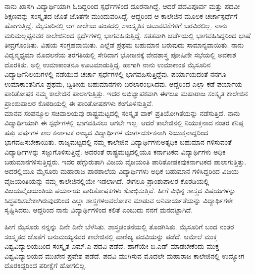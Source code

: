 {ನಾನು ಖಾಸಗಿ ವಿದ್ಯಾರ್ಥಿಯಾಗಿ ಓದಿದ್ದರಿಂದ ಸ್ಪರ್ಧೆಗಳಿಂದ ದೂರನಾಗಿದ್ದೆ.  ಆದರೆ ಪದವಿಪೂರ್ವ ಮತ್ತು ಪದವೀ ಶಿಕ್ಷಣವನ್ನು ಸಂಸ್ಕೃತದ ಜೊತೆ ಜೊತೆಗೇ ಮುಂದುವರಿಸಿದ್ದೆ.  ಆದ್ದರಿಂದ  ಆ ಕಾಲೇಜಿನ ಮೂಲಕ ಚರ್ಚಾಸ್ಪರ್ಧೆಗೆ ಹೋಗುತ್ತಿದ್ದೆ.  ಮೈಸೂರಿನಲ್ಲಿ ಆಗ ಕಾಲೇಜು ಹಂತದಲ್ಲಿ ಸಾಂಸ್ಕೃತಿಕ ಚಟುವಟಿಕೆಗಳಿಗೆ ಬರವಿರಲಿಲ್ಲ.  ನಾನು ಮರಿಮಲ್ಲಪ್ಪನವರ ಕಾಲೇಜಿನಿಂದ ಸ್ಪರ್ಧೆಗಳಲ್ಲಿ ಭಾಗವಹಿಸುತ್ತಿದ್ದೆ.  ಸತತವಾಗಿ ಚರ್ಚೆಯಲ್ಲಿ ಭಾಗವಹಿಸಿದ್ದರಿಂದ ಭಾಷೆ ತೀವ್ರಗೊಂಡಿತು.  ವಿಷಯ ಸಂಗ್ರಹವಾಯಿತು.  ಎಲ್ಲೆಡೆ ಪ್ರಥಮ ಬಹುಮಾನ ಬರುವುದು ಸಾಮಾನ್ಯವಾಯಿತು.  ನಾನು ವಿದ್ವನ್ಮಧ್ಯಮಾ ಮೊದಲನೆಯ ತರಗತಿಯಲ್ಲಿ ಸೇರಿದಾಗ ಭೋಜನಕ್ಕೆ ವೇದಶಾಸ್ತ್ರ ಪೋಷಿಣೀ ಸಭೆಯಲ್ಲಿ ಅವಕಾಶ ದೊರಕಿತು.  ಅಲ್ಲಿ ಉಮಾಕಾಂತನೂ ಊಟಮಾಡುತ್ತಿದ್ದ.  ಹಾಗಾಗಿ ನಾನು ಉಮಾಕಾಂತ ಮೈಸೂರಿನ ವಿದ್ಯಾರ್ಥಿನಿಲಯಗಳಲ್ಲಿ ನಡೆಯುವ ಚರ್ಚಾ \hbox{ಸ್ಪರ್ಧೆಗಳಲ್ಲಿ} ಭಾಗವಹಿಸುತ್ತಿದ್ದೆವು.  ಪರ್ಯಾಯದಂತೆ ನನಗೂ ಉಮಾಕಾಂತನಿಗೂ ಪ್ರಥಮ, ದ್ವಿತೀಯ ಬಹುಮಾನಗಳು ಬರಲಾರಂಭಿಸಿದವು.  ಆದ್ದರಿಂದ ಎಲ್ಲಾ ಕಡೆ ಪರ್ಯಾಯ ಪಾರಿ\-ತೋಷಕ ನಮ್ಮ ಕಾಲೇಜಿನ ಪಾಲಾಗುತ್ತಿತ್ತು. ಇದರ ಅಭಿಜ್ಞಾಪಕವಾಗಿ ಈಗಲೂ \hbox{ಮಹಾರಾಜ} ಸಂಸ್ಕೃತ ಕಾಲೇಜಿನ ಪ್ರಾಂಶುಪಾಲರ ಕೊಠಡಿಯಲ್ಲಿ ಈ ಪಾರಿತೋಷಕಗಳು ಕಂಗೊಳಿಸುತ್ತಿವೆ.  
~\\[0.3cm]
ಮಾನವ ಸಂಪನ್ಮೂಲ ಸಚಿವಾಲಯವು ರಾಷ್ಟ್ರಮಟ್ಟದಲ್ಲಿ ಸಂಸ್ಕೃತ ವಾಕ್ ಪ್ರತಿ\-ಯೋಗಿತೆಯನ್ನು ನಡೆಸುತ್ತಿದೆ.  ನಾನು ವಿದ್ಯಾರ್ಥಿಯಾಗಿ ಈ ಸ್ಪರ್ಧೆಗಳಲ್ಲಿ ಭಾಗ\-ವಹಿಸಲು ಆಗಲೇ ಇಲ್ಲ.  ಆದರೆ ಕಾಲೇಜಿನಲ್ಲಿ ನಿಯುಕ್ತನಾದ ನಂತರ ಕನಿಷ್ಠ ಹತ್ತು ವರ್ಷಗಳ ಕಾಲ ಕರ್ನಾಟಕ ರಾಜ್ಯದ ವಿದ್ಯಾರ್ಥಿಗಳ ಮಾರ್ಗದರ್ಶಕನಾಗಿ ನಿಯುಕ್ತನಾದ್ದರಿಂದ ಭಾಗವ\-ಹಿಸಬೇಕಾಯಿತು.  ರಾಜ್ಯಮಟ್ಟದಲ್ಲಿ ನಮ್ಮ ಕಾಲೇಜಿನ ವಿದ್ಯಾರ್ಥಿಗಳು\break ಅತ್ಯಧಿಕ ಬಹುಮಾನ ಗಳಿಸುವಂತೆ ವಿದ್ಯಾರ್ಥಿಗಳನ್ನು ಸಜ್ಜುಗೊಳಿಸುತ್ತಿದ್ದೆ.  ಅದರಂತೆ ರಾಷ್ಟ್ರಮಟ್ಟದಲ್ಲಿಯೂ ಕರ್ನಾಟಕದ ವಿದ್ಯಾರ್ಥಿಗಳು ಅಧಿಕ ಬಹುಮಾನ\break ಗಳಿಸುತ್ತಿದ್ದರು.  ಇದರ ಹೆಗ್ಗುರುತಾಗಿ ವಿಜಯ ವೈಜಯಂತಿ ಪಾರಿತೋಷಕವು\break ಕರ್ನಾಟಕದ ಪಾಲಾಗುತ್ತಿತ್ತು.  ಅದರಲ್ಲಿಯೂ ಮೈಸೂರು ಮಹಾರಾಜ ಪಾಠಶಾಲೆಯ ವಿದ್ಯಾರ್ಥಿ\-ಗಳು ಅಧಿಕ ಬಹುಮಾನ ಗಳಿಸಿದ್ದರಿಂದ ವಿಜಯ \hbox{ವೈಜಯಂತಿಯನ್ನು} ನಮ್ಮ ಕಾಲೇಜಿನಲ್ಲಿಯೇ ಇಡಲಾಗಿದೆ.  ಈಗಲೂ ಪ್ರಾಂಶುಪಾಲರ ಕೊಠಡಿಯಲ್ಲಿ ವಿಜಯ\hbox{ವೈಜಯಂತಿಯ} ಪರ್ಯಾಯ ಪಾರಿತೋಷಕಗಳು ಶೋಭಿಸುತ್ತಿವೆ.  ಹೀಗೆ ವಿಭಿನ್ನ ಶಾಸ್ತ್ರದ ವಿಷಯಗಳನ್ನು ಸಿದ್ಧಪಡಿಸಬೇಕಾಗಿರುವುದರಿಂದ ಎಲ್ಲಾ ಶಾಸ್ತ್ರಗಳ\break ಅವಲೋಕನ ಮಾಡುವ ಅನಿವಾರ್ಯತೆಯನ್ನು ವಿದ್ಯಾರ್ಥಿಗಳೇ ಸೃಷ್ಟಿಸಿದರು.   ಆದ್ದರಿಂದ ನಾನು ವಿದ್ಯಾರ್ಥಿಗಳಿಂದ ಕಲಿತೆ ಎಂಬುದು ನನಗೆ ಮನದಟ್ಟಾಗಿದೆ.  

ಹೀಗೆ ಮೈಸೂರು ನನ್ನನ್ನು ದಿನೇ ದಿನೇ ಬೆಳೆಸಿತು.  ಶಾಸ್ತ್ರಚಿಂತನೆಯಲ್ಲಿ ತೊಡಗಿಸಿತು.  ಮೈಸೂರಿಗೆ ಬಂದ ನಂತರ ಸಂಸ್ಕೃತದ ಜೊತೆಗೆ ಬನುಮಯ್ಯನವರ ಕಾಲೇಜಿನಲ್ಲಿ ವಾಣಿಜ್ಯ ಪದವಿಯನ್ನು ಪಡೆದೆ. ಆಮೇಲೆ ಮುಕ್ತ ವಿಶ್ವವಿದ್ಯಾಲಯದಿಂದ ಸಂಸ್ಕೃತ ಎಮ್.ಎ ಪದವಿ ಪಡೆದೆ. ಹಾಗೆಯೇ ಬಿ.ಎಡ್ ಮಾಡಬೇಕೆಂದು ಮುಕ್ತ ವಿಶ್ವ\-ವಿದ್ಯಾಲಯದ ಮುಖೇನ ಪ್ರವೇಶ ಪಡೆದೆ. ಪದವಿ ಮುಗಿಸುವ ಮೊದಲೇ ಮಹಾರಾಜ ಕಾಲೇಜಿ\-ನಲ್ಲಿ ಉದ್ಯೋಗ ದೊರಕಿದ್ದರಿಂದ ಪರೀಕ್ಷೆಗೆ ಹೋಗಲಿಲ್ಲ.  

}

